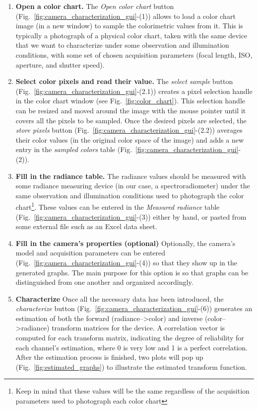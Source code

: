 \documentclass[a4paper,12pt,oneside]{article}
\begin{document}
\begin{enumerate}
	\item \textbf{Open a color chart.}
	The \textit{Open color chart} button (Fig.~\ref{fig:camera_characterization_gui}-(1)) allows to load a color chart image (in a new window) to sample the colorimetric values from it. This is typically a photograph of a physical color chart, taken with the same device that we want to characterize under some observation and illumination conditions, with some set of chosen acquisition parameters (focal length, ISO, aperture, and shutter speed).
	
	\item \textbf{Select color pixels and read their value.}
		The \textit{select sample} button (Fig.~\ref{fig:camera_characterization_gui}-(2.1)) creates a pixel selection handle in the color chart window (see Fig.~\ref{fig:color_chart}). This selection handle can be resized and moved around the image with the mouse pointer until it covers all the pixels to be sampled. Once the desired pixels are selected, the \textit{store pixels} button (Fig.~\ref{fig:camera_characterization_gui}-(2.2)) averages their color values (in the original color space of the image) and adds a new entry in the \textit{sampled colors} table (Fig.~\ref{fig:camera_characterization_gui}-(2)).
	\item \textbf{Fill in the radiance table.}
	The radiance values should be measured with some radiance measuring device (in our case, a spectroradiometer) under the same observation and illumination conditions used to photograph the color chart\footnote{Keep in mind that these values will be the same regardless of the acquisition parameters used to photograph each color chart}. These values can be entered in the \textit{Measured radiance} table (Fig.~\ref{fig:camera_characterization_gui}-(3)) either by hand, or pasted from some external file such as an Excel data sheet.
	\item \textbf{Fill in the camera's properties (optional)}
	Optionally, the camera's model and acquisition parameters can be entered (Fig.~\ref{fig:camera_characterization_gui}-(4)) so that they show up in the generated graphs. The main purpose for this option is so that graphs can be distinguished from one another and organized accordingly.
	\item \textbf{Characterize}
	Once all the necessary data has been introduced, the \textit{characterize} button (Fig.~\ref{fig:camera_characterization_gui}-(6)) generates an estimation of both the forward (radiance--\textgreater color) and inverse (color--\textgreater radiance) transform matrices for the device. A correlation vector is computed for each transform matrix, indicating the degree of reliability for each channel's estimation, where 0 is very low and 1 is a perfect correlation. After the estimation process is finished, two plots will pop up (Fig.~\ref{fig:estimated_graphs}) to illustrate the estimated transform function.
\end{enumerate}
\end{document}

